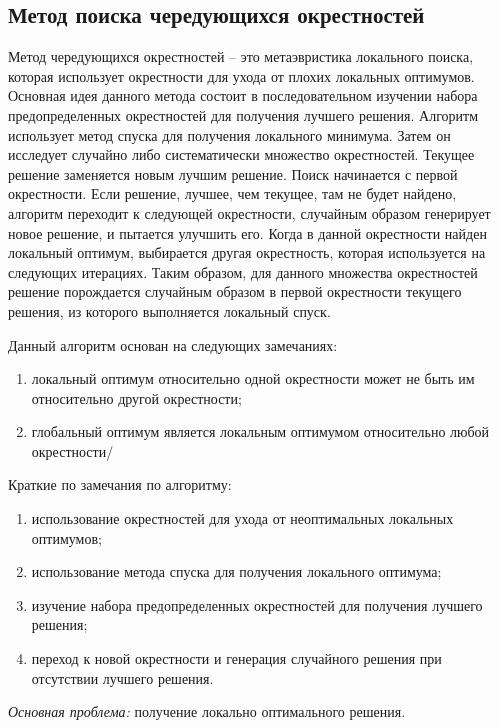 \subsection{Метод поиска чередующихся окрестностей}
Метод чередующихся окрестностей -- это метаэвристика локального поиска, которая использует окрестности для 
ухода от плохих локальных оптимумов. Основная идея данного метода состоит в последовательном изучении набора
предопределенных окрестностей для получения лучшего решения. Алгоритм использует метод спуска для получения 
локального минимума. Затем он исследует случайно либо систематически множество окрестностей. Текущее решение 
заменяется новым лучшим решение. Поиск начинается с первой окрестности. Если решение, лучшее, чем текущее, 
там не будет найдено, алгоритм переходит к следующей окрестности, случайным образом генерирует новое решение, 
и пытается улучшить его. Когда в данной окрестности найден локальный оптимум, выбирается другая окрестность, 
которая используется на следующих итерациях. Таким образом, для данного множества окрестностей решение 
порождается случайным образом в первой окрестности текущего решения, из которого выполняется локальный спуск.

Данный алгоритм основан на следующих замечаниях:
\begin{enumerate}
    \item локальный оптимум относительно одной окрестности может не быть им относительно другой 
        окрестности;
    \item глобальный оптимум является локальным оптимумом относительно любой окрестности/
\end{enumerate}

Краткие по замечания по алгоритму:
\begin{enumerate}
    \item использование окрестностей для ухода от неоптимальных локальных оптимумов;
    \item использование метода спуска для получения локального оптимума;
    \item изучение набора предопределенных окрестностей для получения лучшего решения;
    \item переход к новой окрестности и генерация случайного решения при отсутствии лучшего решения.
\end{enumerate}

\emph{Основная проблема:} получение локально оптимального решения.

